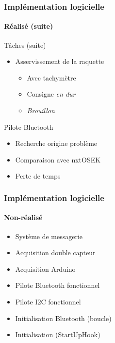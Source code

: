 \documentclass{beamer}
\begin{document}
  \begin{frame}
    \frametitle{Implémentation logicielle}
    \framesubtitle{Réalisé (suite)}

    Tâches (suite)
    \begin{itemize}
      \item Asservissement de la raquette
      \begin{itemize}
        \item Avec tachymètre
        \item Consigne {\it en dur}
        \item {\it Brouillon}
      \end{itemize}
    \end{itemize} \vspace{1em}

    Pilote Bluetooth
    \begin{itemize}
      \item Recherche origine problème
      \item Comparaison avec nxtOSEK
      \item Perte de temps
    \end{itemize}
  \end{frame}

  \begin{frame}
    \frametitle{Implémentation logicielle}
    \framesubtitle{Non-réalisé}

    \begin{itemize}
      \item Système de messagerie
      \item Acquisition double capteur
      \item Acquisition Arduino
      \vspace{1em}
      \item Pilote Bluetooth fonctionnel
      \item Pilote I2C fonctionnel
      \vspace{1em}
      \item Initialisation Bluetooth (boucle)
      \item Initialisation (StartUpHook)
    \end{itemize}
  \end{frame}

\end{document}
